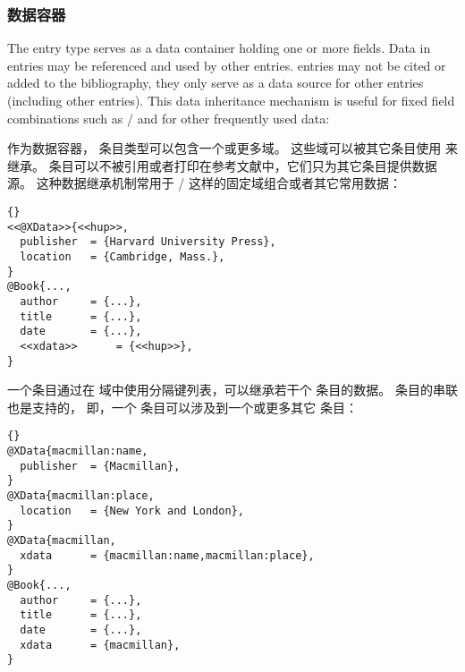 \subsubsection[数据容器]{数据容器}%
\label{use:use:xdat}

The  entry type serves as a data container holding one or more fields. Data in  entries may be referenced and used by other entries.  entries may not be cited or added to the bibliography, they only serve as a data source for other entries (including other  entries). This data inheritance mechanism is useful for fixed field combinations such as \slash {} and for other frequently used data:


作为数据容器， 条目类型可以包含一个或更多域。
这些域可以被其它条目使用  来继承。
 条目可以不被引用或者打印在参考文献中，它们只为其它条目提供数据源。
这种数据继承机制常用于 \slash {} 这样的固定域组合或者其它常用数据：

\begin{lstlisting}[style=bibtex]{}
<<@XData>>{<<hup>>,
  publisher  = {Harvard University Press},
  location   = {Cambridge, Mass.},
}
@Book{...,
  author     = {...},
  title	     = {...},
  date	     = {...},
  <<xdata>>      = {<<hup>>},
}
\end{lstlisting}
%
一个条目通过在  域中使用分隔键列表，可以继承若干个  条目的数据。
 条目的串联也是支持的，
即，一个  条目可以涉及到一个或更多其它  条目：

\begin{lstlisting}[style=bibtex]{}
@XData{macmillan:name,
  publisher  = {Macmillan},
}
@XData{macmillan:place,
  location   = {New York and London},
}
@XData{macmillan,
  xdata      = {macmillan:name,macmillan:place},
}
@Book{...,
  author     = {...},
  title	     = {...},
  date	     = {...},
  xdata	     = {macmillan},
}
\end{lstlisting}
%

